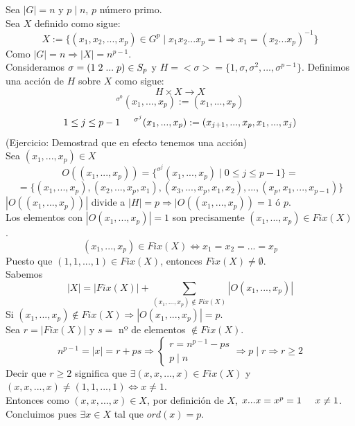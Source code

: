 \documentclass[11pt,a4paper]{article}
\begin{document}
Sea $|G| = n$ y $p \mid n$, $p$ número primo. \\
Sea $X$ definido como sigue:
$$X := \{(x_{1}, x_{2}, ..., x_{p}) \in G^{p} \mid x_{1}x_{2}...x_{p} = 1 \Rightarrow x_{1} = (x_{2}...x_{p})^{-1}\}$$
Como $|G| = n \Rightarrow |X| = n^{p-1}$. \\
Consideramos $\sigma = (1 \hspace{0.1cm} 2 \hspace{0.1cm} ... \hspace{0.1cm} p) \in S_{p}$ y $H = <\sigma> = \{1, \sigma, \sigma^{2}, ..., \sigma^{p-1}\}$.
Definimos una acción de $H$ sobre $X$ como sigue:
$$H \times X \to X$$
$$^{\sigma^{0}}(x_{1}, ..., x_{p}) := (x_{1}, ..., x_{p})$$
$$1 \leq j \leq p-1 \hspace{0.5cm} ^{\sigma^{j}}(x_{1}, ..., x_{p}) := (x_{j+1}, ..., x_{p}, x_{1}, ..., x_{j})$$
(Ejercicio: Demostrad que en efecto tenemos una acción) \\
Sea $(x_{1}, ..., x_{p}) \in X$
$$O((x_{1}, ..., x_{p})) = \{^{\sigma^{j}}(x_{1}, ..., x_{p}) \mid 0 \leq j \leq p-1\} =$$ $$= \{(x_{1}, ..., x_{p}), (x_{2}, ..., x_{p}, x_{1}), (x_{3}, ..., x_{p}, x_{1}, x_{2}), ..., (x_{p}, x_{1}, ..., x_{p-1})\}$$
$|O((x_{1}, ..., x_{p}))|$ divide a $|H| = p \Rightarrow |O((x_{1}, ..., x_{p})) = 1$ ó $p$. \\
Los elementos con $|O(x_{1}, ..., x_{p})| = 1$ son precisamente $(x_{1}, ..., x_{p}) \in Fix(X)$. 
$$(x_{1}, ..., x_{p}) \in Fix(X) \iff x_{1} = x_{2} = ... = x_{p}$$
Puesto que $(1, 1, ..., 1) \in Fix(X)$, entonces $Fix(X) \neq \emptyset$. \\
Sabemos
$$|X| = |Fix(X)| + \sum_{(x_{1}, ..., x_{p}) \notin Fix(X)} |O(x_{1}, ..., x_{p})|$$
Si $(x_{1}, ..., x_{p}) \notin Fix(X) \Rightarrow |O(x_{1}, ..., x_{p})| = p$. \\
Sea $r = |Fix(X)|$ y $s = $ nº de elementos $\notin Fix(X)$.
$$n^{p-1} = |x| = r + ps \Rightarrow
\begin{cases}
r = n^{p-1} - ps \\
p \mid n
\end{cases}
\Rightarrow
p \mid r \Rightarrow r \geq 2$$
Decir que $r \geq 2$ significa que $\exists (x, x, ..., x) \in Fix(X)$ y  \\ $(x, x, ..., x) \neq (1, 1, ..., 1) \iff x \neq 1$. \\
Entonces como $(x, x, ..., x) \in X$, por definición de $X$, $x...x = x^{p} = 1 \hspace{0.5cm} x \neq 1$. \\
Concluimos pues $\exists x \in X$ tal que $ord(x) = p$.
\end{document}
